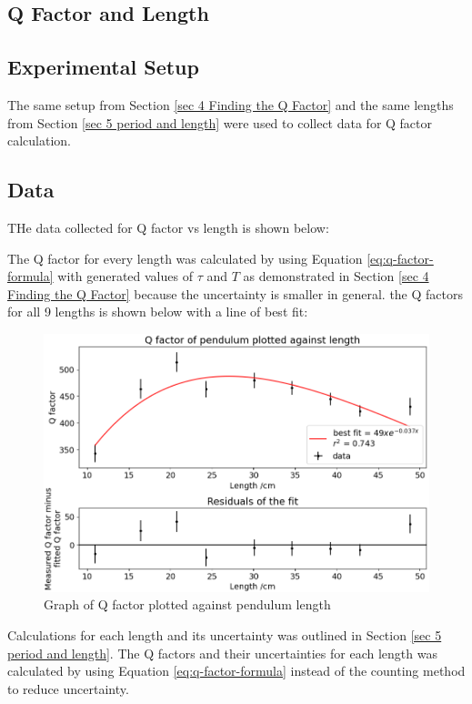 \documentclass[11pt]{article}
\begin{document}
\begin{multicols}{2}
\section{Q Factor and Length}

\subsection{Experimental Setup}
The same setup from Section \ref{sec 4 Finding the Q Factor} and the same lengths from Section \ref{sec 5 period and length} were used to collect data for Q factor calculation.


\subsection{Data}
THe data collected for Q factor vs length is shown below:

The Q factor for every length was calculated by using Equation \ref{eq:q-factor-formula} with generated values of $\tau$ and $T$ as demonstrated in Section \ref{sec 4 Finding the Q Factor} because the uncertainty is smaller in general. the Q factors for all 9 lengths is shown below with a line of best fit:

\begin{figure}[H]
    \centering
    \includegraphics[width=\linewidth]{../figures/qfactor_vs_length.png}
    \caption{\centering Graph of Q factor plotted against pendulum length}
    \label{fig:figure 8}
\end{figure}

Calculations for each length and its uncertainty was outlined in Section \ref{sec 5 period and length}. The Q factors and their uncertainties for each length was calculated by using Equation \ref{eq:q-factor-formula} instead of the counting method to reduce uncertainty.


\end{multicols}
\end{document}
